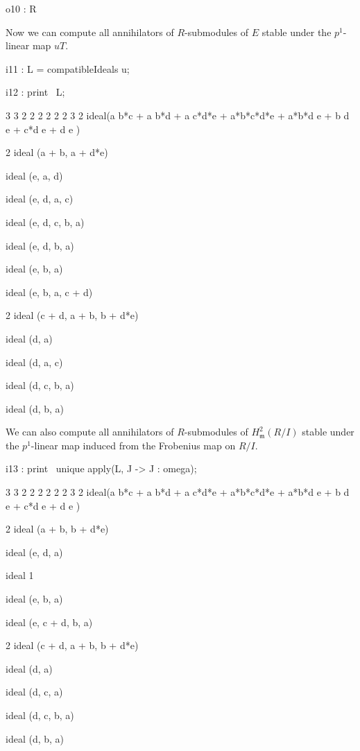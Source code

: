 \documentclass{amsart}
\begin{document}
\begin{example}
{\begin{MyVerbatim}
o10 : R
\end{MyVerbatim}
}
\medskip

Now we can compute all annihilators of $R$-submodules of $E$ stable under the $p^1$-linear map $uT$.

\medskip
{\small
{}
\begin{MyVerbatim}
i11 : L = compatibleIdeals u;

i12 : print \ L;

       3       3       2                         2     2 2       2 2    3 2
ideal(a b*c + a b*d + a c*d*e + a*b*c*d*e + a*b*d e + b d e + c*d e  + d e )

               2
ideal (a + b, a  + d*e)

ideal (e, a, d)

ideal (e, d, a, c)

ideal (e, d, c, b, a)

ideal (e, d, b, a)

ideal (e, b, a)

ideal (e, b, a, c + d)

                      2
ideal (c + d, a + b, b  + d*e)

ideal (d, a)

ideal (d, a, c)

ideal (d, c, b, a)

ideal (d, b, a)
\end{MyVerbatim}
}
\medskip

We can also compute  all annihilators of $R$-submodules of $H^2_{\mathfrak{m}} (R/I)$ stable under the $p^1$-linear map induced from the Frobenius map on $R/I$.

\medskip
{\small
{}
\begin{MyVerbatim}
i13 : print \ unique apply(L, J -> J : omega);
   
       3       3       2                         2     2 2       2 2    3 2
ideal(a b*c + a b*d + a c*d*e + a*b*c*d*e + a*b*d e + b d e + c*d e  + d e )
       
               2
ideal (a + b, b  + d*e)

ideal (e, d, a)

ideal 1

ideal (e, b, a)

ideal (e, c + d, b, a)

                      2
ideal (c + d, a + b, b  + d*e)

ideal (d, a)

ideal (d, c, a)

ideal (d, c, b, a)

ideal (d, b, a)
\end{MyVerbatim}
}
\medskip

\end{example}
\end{document}
